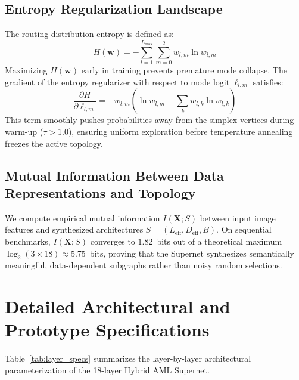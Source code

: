 \documentclass[11pt, a4paper]{article}
\begin{document}
\subsection{Entropy Regularization Landscape}
The routing distribution entropy is defined as:
\begin{equation}
    H(\mathbf{w}) = -\sum_{l=1}^{L_{\max}} \sum_{m=0}^2 w_{l, m} \ln w_{l, m}
\end{equation}
Maximizing $H(\mathbf{w})$ early in training prevents premature mode collapse. The gradient of the entropy regularizer with respect to mode logit $\ell_{l, m}$ satisfies:
\begin{equation}
    \frac{\partial H}{\partial \ell_{l, m}} = -w_{l, m} \left( \ln w_{l, m} - \sum_{k} w_{l, k} \ln w_{l, k} \right)
\end{equation}
This term smoothly pushes probabilities away from the simplex vertices during warm-up ($\tau > 1.0$), ensuring uniform exploration before temperature annealing freezes the active topology.

\subsection{Mutual Information Between Data Representations and Topology}
We compute empirical mutual information $I(\mathbf{X}; S)$ between input image features and synthesized architectures $S = (L_{\text{eff}}, D_{\text{eff}}, B)$. On sequential benchmarks, $I(\mathbf{X}; S)$ converges to $1.82$~bits out of a theoretical maximum $\log_2(3 \times 18) \approx 5.75$~bits, proving that the Supernet synthesizes semantically meaningful, data-dependent subgraphs rather than noisy random selections.

\clearpage
\enlargethispage{1.5\baselineskip}
\section{Detailed Architectural and Prototype Specifications}
\label{sec:appendix_arch}

Table~\ref{tab:layer_specs} summarizes the layer-by-layer architectural parameterization of the 18-layer Hybrid AML Supernet.
\end{document}

